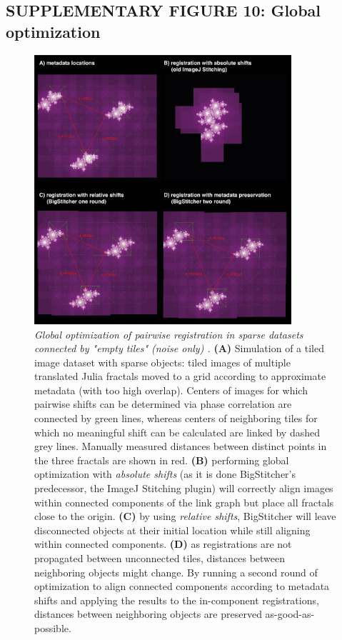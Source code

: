 \documentclass[]{spie}  %
\begin{document}
\pagebreak

\pagebreak
\subsection*{SUPPLEMENTARY FIGURE 10: Global optimization}
\vspace{1mm}
\begin{figure}[h!]
\centerline{\includegraphics[width=0.85\textwidth]{fig-globalopt.jpg}}
\vspace{2.0mm}
\caption{\hspace{-0.5mm} \emph{Global optimization of pairwise registration in sparse datasets connected by "empty tiles" (noise only) .} \textbf{(A)} Simulation of a tiled image dataset with sparse objects: tiled images of multiple translated Julia fractals moved to a grid according to approximate metadata (with too high overlap). Centers of images for which pairwise shifts can be determined via phase correlation are connected by green lines, whereas centers of neighboring tiles for which no meaningful shift can be calculated are linked by dashed grey lines. Manually measured distances between distinct points in the three fractals are shown in red. \textbf{(B)} performing global optimization with \emph{absolute shifts} (as it is done BigStitcher's predecessor, the ImageJ Stitching plugin) will correctly align images within connected components of the link graph but place all fractals close to the origin. \textbf{(C)} by using \emph{relative shifts}, BigStitcher will leave disconnected objects at their initial location while still aligning within connected components. \textbf{(D)} as registrations are not propagated between unconnected tiles, distances between neighboring objects might change. By running a second round of optimization to align connected components according to metadata shifts and applying the results to the in-component registrations, distances between neighboring objects are preserved as-good-as-possible.
}
\label{fig:sup-fig-globalopt}
\end{figure}
\end{document}
